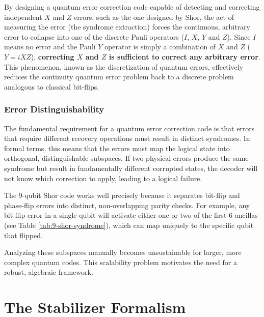 By designing a quantum error correction code capable of detecting and correcting independent $X$ and $Z$ errors, such as the one designed by Shor, the act of measuring the error (the syndrome extraction) forces the continuous, arbitrary error to collapse into one of the discrete Pauli operators ($I$, $X$, $Y$ and $Z$). Since $I$ means no error and the Pauli $Y$ operator is simply a combination of $X$ and $Z$ ($Y = iXZ$), \textbf{correcting $X$ and $Z$ is sufficient to correct any arbitrary error}. This phenomenon, known as the discretization of quantum errors, effectively reduces the continuity quantum error problem back to a discrete problem analogous to classical bit-flips.

\subsubsection*{Error Distinguishability}
\label{sec:distinguishability}

The fundamental requirement for a quantum error correction code is that errors that require different recovery operations must result in distinct syndromes. In formal terms, this means that the errors must map the logical state into orthogonal, distinguishable subspaces. If two physical errors produce the same syndrome but result in fundamentally different corrupted states, the decoder will not know which correction to apply, leading to a logical failure.

The 9-qubit Shor code works well precisely because it separates bit-flip and phase-flip errors into distinct, non-overlapping parity checks. For example, any bit-flip error in a single qubit will activate either one or two of the first 6 ancillas (see Table \ref{tab:9-shor-syndrome}), which can map uniquely to the specific qubit that flipped. 

Analyzing these subspaces manually becomes unsustainable for larger, more complex quantum codes. This scalability problem motivates the need for a robust, algebraic framework.

\section{The Stabilizer Formalism}
\label{sec:stabilizer_formalism}

